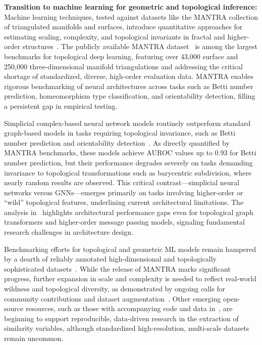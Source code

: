 \documentclass[sigconf]{acmart}
\begin{document}
\textbf{Transition to machine learning for geometric and topological inference:}
Machine learning techniques, tested against datasets like the MANTRA collection of triangulated manifolds and surfaces, introduce quantitative approaches for estimating scaling, complexity, and topological invariants in fractal and higher-order structures~\cite{ref26,ref39}. The publicly available MANTRA dataset~\cite{ref26} is among the largest benchmarks for topological deep learning, featuring over 43,000 surface and 250,000 three-dimensional manifold triangulations and addressing the critical shortage of standardized, diverse, high-order evaluation data. MANTRA enables rigorous benchmarking of neural architectures across tasks such as Betti number prediction, homeomorphism type classification, and orientability detection, filling a persistent gap in empirical testing.

Simplicial complex-based neural network models routinely outperform standard graph-based models in tasks requiring topological invariance, such as Betti number prediction and orientability detection~\cite{ref26}. As directly quantified by MANTRA benchmarks, these models achieve AUROC values up to 0.93 for Betti number prediction, but their performance degrades severely on tasks demanding invariance to topological transformations such as barycentric subdivision, where nearly random results are observed. This critical contrast—simplicial neural networks versus GNNs—emerges primarily on tasks involving higher-order or ``wild'' topological features, underlining current architectural limitations. The analysis in~\cite{ref26} highlights architectural performance gaps even for topological graph transformers and higher-order message passing models, signaling fundamental research challenges in architecture design.

Benchmarking efforts for topological and geometric ML models remain hampered by a dearth of reliably annotated high-dimensional and topologically sophisticated datasets~\cite{ref26,ref39}. While the release of MANTRA marks significant progress, further expansion in scale and complexity is needed to reflect real-world wildness and topological diversity, as demonstrated by ongoing calls for community contributions and dataset augmentation~\cite{ref26}. Other emerging open-source resources, such as those with accompanying code and data in~\cite{ref65}, are beginning to support reproducible, data-driven research in the extraction of similarity variables, although standardized high-resolution, multi-scale datasets remain uncommon.
\end{document}
